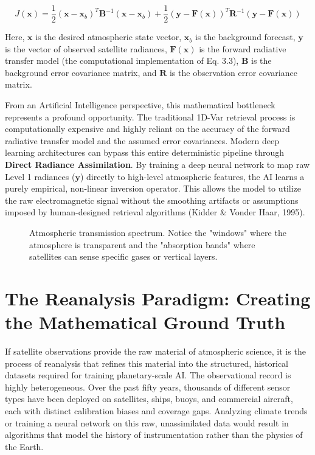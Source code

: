 \begin{equation}
J(\mathbf{x}) = \frac{1}{2}(\mathbf{x} - \mathbf{x}_b)^T \mathbf{B}^{-1} (\mathbf{x} - \mathbf{x}_b) + \frac{1}{2}(\mathbf{y} - \mathbf{F}(\mathbf{x}))^T \mathbf{R}^{-1} (\mathbf{y} - \mathbf{F}(\mathbf{x}))
\end{equation}

Here, $\mathbf{x}$ is the desired atmospheric state vector, $\mathbf{x}_b$ is the background forecast, $\mathbf{y}$ is the vector of observed satellite radiances, $\mathbf{F}(\mathbf{x})$ is the forward radiative transfer model (the computational implementation of Eq. 3.3), $\mathbf{B}$ is the background error covariance matrix, and $\mathbf{R}$ is the observation error covariance matrix. 

From an Artificial Intelligence perspective, this mathematical bottleneck represents a profound opportunity. The traditional 1D-Var retrieval process is computationally expensive and highly reliant on the accuracy of the forward radiative transfer model and the assumed error covariances. Modern deep learning architectures can bypass this entire deterministic pipeline through \textbf{Direct Radiance Assimilation}. By training a deep neural network to map raw Level 1 radiances ($\mathbf{y}$) directly to high-level atmospheric features, the AI learns a purely empirical, non-linear inversion operator. This allows the model to utilize the raw electromagnetic signal without the smoothing artifacts or assumptions imposed by human-designed retrieval algorithms (Kidder \& Vonder Haar, 1995).

\begin{figure}[H]
    \centering
    \caption{Atmospheric transmission spectrum. Notice the "windows" where the atmosphere is transparent and the "absorption bands" where satellites can sense specific gases or vertical layers.}
    \label{fig:atmospheric_transmission}
\end{figure}

\section{The Reanalysis Paradigm: Creating the Mathematical Ground Truth}

If satellite observations provide the raw material of atmospheric science, it is the process of reanalysis that refines this material into the structured, historical datasets required for training planetary-scale AI. The observational record is highly heterogeneous. Over the past fifty years, thousands of different sensor types have been deployed on satellites, ships, buoys, and commercial aircraft, each with distinct calibration biases and coverage gaps. Analyzing climate trends or training a neural network on this raw, unassimilated data would result in algorithms that model the history of instrumentation rather than the physics of the Earth.

